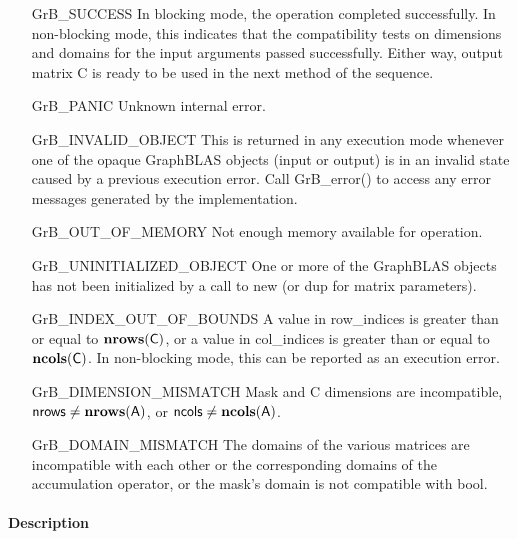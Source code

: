 \begin{itemize}[leftmargin=2.1in]
    \item[{\sf GrB\_SUCCESS}]         In blocking mode, the operation completed
    successfully. In non-blocking mode, this indicates that the compatibility 
    tests on dimensions and domains for the input arguments passed successfully. 
    Either way, output matrix {\sf C} is ready to be used in the next method of 
    the sequence.

    \item[{\sf GrB\_PANIC}]           Unknown internal error.
    
    \item[{\sf GrB\_INVALID\_OBJECT}] This is returned in any execution mode 
    whenever one of the opaque GraphBLAS objects (input or output) is in an invalid 
    state caused by a previous execution error.  Call {GrB\_error()} to access 
    any error messages generated by the implementation.

    \item[{\sf GrB\_OUT\_OF\_MEMORY}]  Not enough memory available for operation.

    \item[{\sf GrB\_UNINITIALIZED\_OBJECT}] One or more of the GraphBLAS objects 
    has not been initialized by a call to {\sf new} (or {\sf dup} for matrix
    parameters).

    \item[{\sf GrB\_INDEX\_OUT\_OF\_BOUNDS}]  A value in {\sf row\_indices} 
    is greater than or equal to $\bold{nrows}({\sf C})$, or a value in 
    {\sf col\_indices} is greater than or equal to $\bold{ncols}({\sf C})$.  In 
    non-blocking mode, this can be reported as an execution error.
    
    \item[{\sf GrB\_DIMENSION\_MISMATCH}] {\sf Mask} and {\sf C} dimensions are
    incompatible, ${\sf nrows} \neq \bold{nrows}({\sf A})$, or 
    ${\sf ncols} \neq \bold{ncols}({\sf A})$.

    \item[{\sf GrB\_DOMAIN\_MISMATCH}]     The domains of the various matrices
    are incompatible with each other or the corresponding domains of the 
    accumulation operator, or the mask's domain is not compatible with bool.
\end{itemize}

\paragraph{Description}

